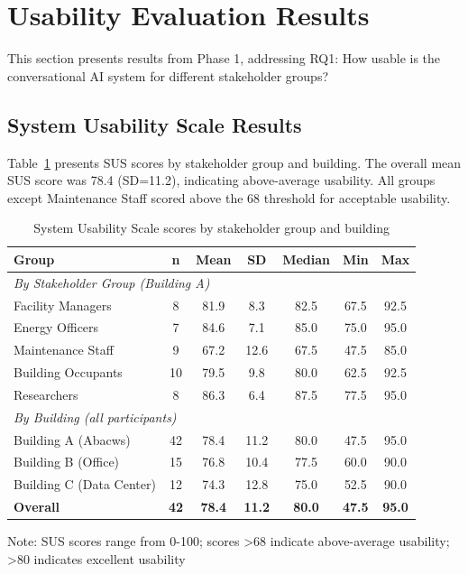 \documentclass[acmlarge]{acmart}
\begin{document}
\section{Usability Evaluation Results}
\label{sec:usability-evaluation}

This section presents results from Phase 1, addressing RQ1: How usable is the conversational AI system for different stakeholder groups?

\subsection{System Usability Scale Results}

Table~\ref{tab:sus-results} presents SUS scores by stakeholder group and building. The overall mean SUS score was 78.4 (SD=11.2), indicating above-average usability. All groups except Maintenance Staff scored above the 68 threshold for acceptable usability.

\begin{table}[h]
\centering
\begin{threeparttable}
\caption{System Usability Scale scores by stakeholder group and building}
\label{tab:sus-results}
\small
\begin{tabular}{@{}lcccccc@{}}
\toprule
\textbf{Group} & \textbf{n} & \textbf{Mean} & \textbf{SD} & \textbf{Median} & \textbf{Min} & \textbf{Max} \\
\midrule
\multicolumn{7}{l}{\textit{By Stakeholder Group (Building A)}} \\
Facility Managers & 8 & 81.9 & 8.3 & 82.5 & 67.5 & 92.5 \\
Energy Officers & 7 & 84.6 & 7.1 & 85.0 & 75.0 & 95.0 \\
Maintenance Staff & 9 & 67.2 & 12.6 & 67.5 & 47.5 & 85.0 \\
Building Occupants & 10 & 79.5 & 9.8 & 80.0 & 62.5 & 92.5 \\
Researchers & 8 & 86.3 & 6.4 & 87.5 & 77.5 & 95.0 \\
\midrule
\multicolumn{7}{l}{\textit{By Building (all participants)}} \\
Building A (Abacws) & 42 & 78.4 & 11.2 & 80.0 & 47.5 & 95.0 \\
Building B (Office) & 15 & 76.8 & 10.4 & 77.5 & 60.0 & 90.0 \\
Building C (Data Center) & 12 & 74.3 & 12.8 & 75.0 & 52.5 & 90.0 \\
\midrule
\textbf{Overall} & \textbf{42} & \textbf{78.4} & \textbf{11.2} & \textbf{80.0} & \textbf{47.5} & \textbf{95.0} \\
\bottomrule
\end{tabular}
\begin{tablenotes}
\small
\item Note: SUS scores range from 0-100; scores >68 indicate above-average usability; >80 indicates excellent usability
\end{tablenotes}
\end{threeparttable}
\end{table}
\end{document}
